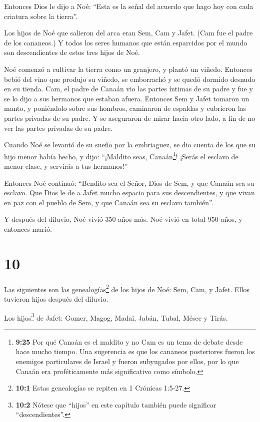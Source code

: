  Entonces Dios le dijo a Noé: ``Esta es la señal del
acuerdo que hago hoy con cada criatura sobre la tierra''.

 Los hijos de Noé que salieron del arca eran Sem, Cam y
Jafet. (Cam fue el padre de los cananeos.)  Y todos los
seres humanos que están esparcidos por el mundo son descendientes de
estos tres hijos de Noé.

 Noé comenzó a cultivar la tierra como un granjero, y
plantó un viñedo.  Entonces bebió del vino que produjo su
viñedo, se emborrachó y se quedó dormido desnudo en su tienda.
 Cam, el padre de Canaán vio las partes íntimas de su padre
y fue y se lo dijo a sus hermanos que estaban afuera. 
Entonces Sem y Jafet tomaron un manto, y poniéndolo sobre sus hombros,
caminaron de espaldas y cubrieron las partes privadas de su padre. Y se
aseguraron de mirar hacia otro lado, a fin de no ver las partes privadas
de su padre.

 Cuando Noé se levantó de su sueño por la embriaguez, se
dio cuenta de los que su hijo menor había hecho,  y dijo:
``¡Maldito seas, Canaán\footnote{\textbf{9:25} Por qué Canaán es el
  maldito y no Cam es un tema de debate desde hace mucho tiempo. Una
  sugerencia es que los cananeos posteriores fueron los enemigos
  particulares de Israel y fueron subyugados por ellos, por lo que
  Canaán era proféticamente más significativo como símbolo.}! ¡Serás el
esclavo de menor clase, y servirás a tus hermanos!''

 Entonces Noé continuó: ``Bendito sea el Señor, Dios de
Sem, y que Canaán sea su esclavo.  Que Dios le de a Jafet
mucho espacio para sus descendientes, y que vivan en paz con el pueblo
de Sem, y que Canaán sea su esclavo también''.

 Y después del diluvio, Noé vivió 350 años más.
 Noé vivió en total 950 años, y entonces murió.

\hypertarget{section-9}{%
\section{10}\label{section-9}}

 Las siguientes son las genealogías\footnote{\textbf{10:1}
  Estas genealogías se repiten en 1 Crónicas 1:5-27.} de los hijos de
Noé: Sem, Cam, y Jafet. Ellos tuvieron hijos después del diluvio.

 Los hijos\footnote{\textbf{10:2} Nótese que ``hijos'' en
  este capítulo también puede significar ``descendientes''.} de Jafet:
Gomer, Magog, Madai, Jabán, Tubal, Mésec y Tirás.

